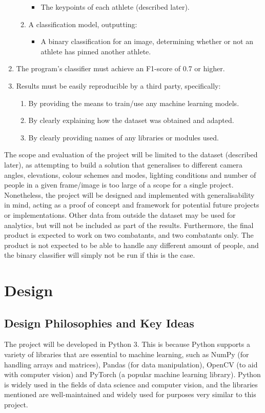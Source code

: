 \documentclass[a4paper, oneside, 11pt]{article}
\begin{document}
\begin{enumerate}
\begin{enumerate}
\begin{itemize}
            \item The keypoints of each athlete (described later).
        \end{itemize}
        \item A classification model, outputting:
        \begin{itemize}
            \item A binary classification for an image, determining whether or not an athlete has pinned another athlete. 
        \end{itemize}
    \end{enumerate}
    \item The program's classifier must achieve an F1-score of 0.7 or higher.
    \item Results must be easily reproducible by a third party, specifically:
    \begin{enumerate}
        \item By providing the means to train/use any machine learning models.
        \item By clearly explaining how the dataset was obtained and adapted.
        \item By clearly providing names of any libraries or modules used.
    \end{enumerate}
\end{enumerate}

\bigskip
\noindent
The scope and evaluation of the project will be limited to the dataset (described later), as attempting to build a solution that generalises to different camera angles, elevations, colour schemes and modes, lighting conditions and number of people in a given frame/image is too large of a scope for a single project. Nonetheless, the project will be designed and implemented with generalisability in mind, acting as a proof of concept and framework for potential future projects or implementations. Other data from outside the dataset may be used for analytics, but will not be included as part of the results. Furthermore, the final product is expected to work on two combatants, and two combatants only. The product is not expected to be able to handle any different amount of people, and the binary classifier will simply not be run if this is the case.

\section{Design}
\subsection{Design Philosophies and Key Ideas}
The project will be developed in Python 3. This is because Python supports a variety of libraries that are essential to machine learning, such as NumPy (for handling arrays and matrices), Pandas (for data manipulation), OpenCV (to aid with computer vision) and PyTorch (a popular machine learning library). Python is widely used in the fields of data science and computer vision, and the libraries mentioned are well-maintained and widely used for purposes very similar to this project.
\end{document}
